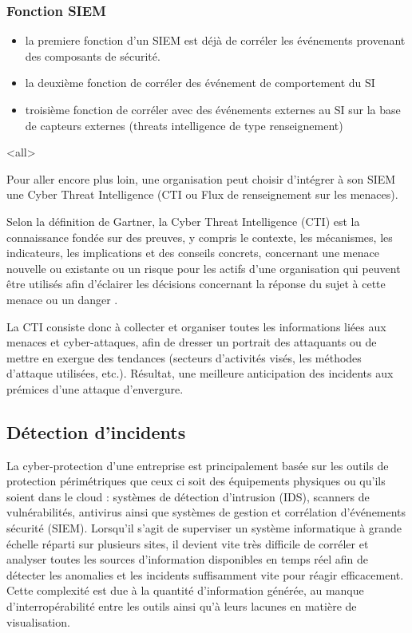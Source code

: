 \begin{frame}
\frametitle<presentation>{Fonction SIEM}
\begin{itemize}
  \item la premiere fonction d'un SIEM est déjà de corréler les événements provenant des composants de sécurité.
  \item la deuxième  fonction de corréler des événement de comportement du SI
  \item troisième fonction de corréler avec des événements externes au SI sur la base de capteurs externes (threats intelligence de type renseignement)
\end{itemize}
\end{frame}


\mode<all>{}

Pour aller encore plus loin, une organisation peut choisir d’intégrer à son SIEM une Cyber Threat Intelligence (CTI ou Flux de renseignement sur les menaces). 

Selon la définition de Gartner, la Cyber Threat Intelligence (CTI) est la connaissance fondée sur des preuves, y compris le contexte, les mécanismes, les indicateurs, les implications et des conseils concrets, concernant une menace nouvelle ou existante ou un risque pour les actifs d’une organisation qui peuvent être utilisés afin d’éclairer les décisions concernant la réponse du sujet à cette menace ou un danger .

La CTI consiste donc à collecter et organiser toutes les informations liées aux menaces et cyber-attaques, afin de dresser un portrait des attaquants ou de mettre en exergue des tendances (secteurs d’activités visés, les méthodes d’attaque utilisées, etc.). Résultat, une meilleure anticipation des incidents aux prémices d’une attaque d’envergure.
 
 \subsection{Détection  d’incidents}



La cyber-protection d'une entreprise est principalement basée sur les outils de protection périmétriques que ceux ci soit des équipements physiques ou qu'ils soient dans le cloud : systèmes de détection d’intrusion (IDS), scanners de vulnérabilités, antivirus ainsi que systèmes de gestion et corrélation d’événements sécurité (SIEM). Lorsqu’il s’agit de superviser un système informatique à grande échelle réparti sur plusieurs sites, il devient vite très difficile de corréler et analyser toutes les sources d’information disponibles en temps réel afin de détecter les anomalies et les incidents suffisamment vite pour réagir efficacement. Cette complexité est due à la quantité d’information générée, au manque d’interropérabilité entre les outils ainsi qu’à leurs lacunes en matière de visualisation.


